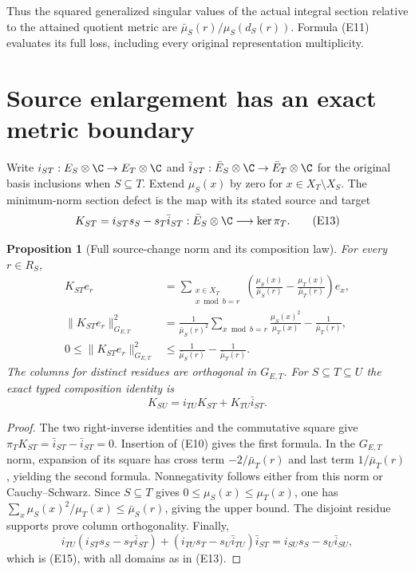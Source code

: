 \documentclass[11pt,a4paper]{article}
\newtheorem{proposition}[theorem]{Proposition}
\begin{document}
Thus the squared generalized singular values of the actual integral
section relative to the attained quotient metric are
\(\bar\mu_S(r)/\mu_S(d_S(r))\).  Formula (E11) evaluates its full loss,
including every original representation multiplicity.

\section{Source enlargement has an exact metric boundary}

Write \(i_{ST}:E_S\otimes\C\to E_T\otimes\C\) and
\(\bar i_{ST}:\bar E_S\otimes\C\to\bar E_T\otimes\C\) for the original
basis inclusions when \(S\subseteq T\).  Extend \(\mu_S(x)\) by zero
for \(x\in X_T\setminus X_S\).  The minimum-norm section defect is the
map with its stated source and target
\[
 K_{ST}=i_{ST}s_S-s_T\bar i_{ST}:
    \bar E_S\otimes\C\longrightarrow\ker\pi_T.
 \tag{E13}
\]
\begin{proposition}[Full source-change norm and its composition law]
For every \(r\in R_S\),
\[
 \begin{split}
 K_{ST}e_r
   &=\sum_{\substack{x\in X_T\\x\bmod b=r}}
      \left(\frac{\mu_S(x)}{\bar\mu_S(r)}
           -\frac{\mu_T(x)}{\bar\mu_T(r)}\right)e_x,\\
 \|K_{ST}e_r\|_{G_{E,T}}^2
   &=\frac{1}{\bar\mu_S(r)^2}
        \sum_{x\bmod b=r}\frac{\mu_S(x)^2}{\mu_T(x)}
        -\frac1{\bar\mu_T(r)},\\
 0\leq\|K_{ST}e_r\|_{G_{E,T}}^2
   &\leq\frac1{\bar\mu_S(r)}-\frac1{\bar\mu_T(r)}.
 \end{split}
 \tag{E14}
\]
The columns for distinct residues are orthogonal in \(G_{E,T}\).  For
\(S\subseteq T\subseteq U\) the exact typed composition identity is
\[
 K_{SU}=i_{TU}K_{ST}+K_{TU}\bar i_{ST}.
 \tag{E15}
\]
\end{proposition}
\begin{proof}
The two right-inverse identities and the commutative square give
\(\pi_TK_{ST}=\bar i_{ST}-\bar i_{ST}=0\).
Insertion of (E10) gives the first formula.  In the \(G_{E,T}\) norm,
expansion of its square has cross term
\(-2/\bar\mu_T(r)\) and last term \(1/\bar\mu_T(r)\), yielding the
second formula.  Nonnegativity follows either from this norm or
Cauchy--Schwarz.  Since \(S\subseteq T\) gives
\(0\leq\mu_S(x)\leq\mu_T(x)\), one has
\(\sum_x\mu_S(x)^2/\mu_T(x)\leq\bar\mu_S(r)\), giving the upper bound.
The disjoint residue supports prove column orthogonality.  Finally,
\[
 i_{TU}(i_{ST}s_S-s_T\bar i_{ST})
 +(i_{TU}s_T-s_U\bar i_{TU})\bar i_{ST}
 =i_{SU}s_S-s_U\bar i_{SU},
 \]
which is (E15), with all domains as in (E13).
\end{proof}
\end{document}
